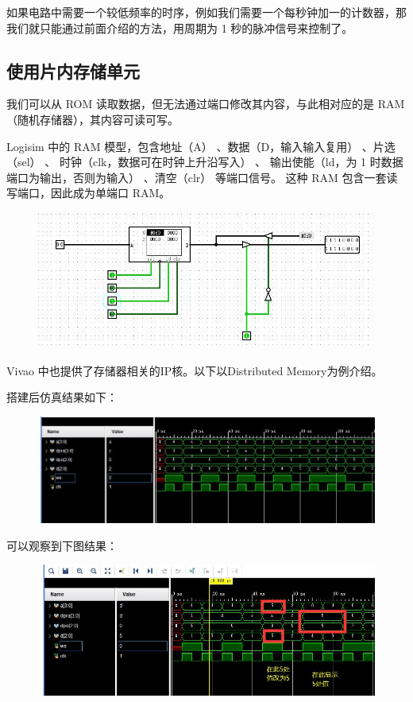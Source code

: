 \documentclass[UTF8]{article}
\begin{document}
	如果电路中需要一个较低频率的时序，例如我们需要一个每秒钟加一的计数器，那我们就只能通过前面介绍的方法，用周期为 1 秒的脉冲信号来控制了。\par
	
	\subsection{使用片内存储单元}
	我们可以从 ROM 读取数据，但无法通过端口修改其内容，与此相对应的是 RAM（随机存储器），其内容可读可写。\par
	Logisim 中的 RAM 模型，包含地址（A） 、数据（D，输入输入复用） 、片选（sel） 、	时钟（clk，数据可在时钟上升沿写入） 、 输出使能（ld，为 1 时数据端口为输出，否则为输入） 、清空（clr） 等端口信号。 这种 RAM 包含一套读写端口，因此成为单端口 RAM。 \par
	\begin{figure}[H]
		\centering
		\includegraphics[width=1\linewidth]{s5.jpg}
		\label{s5}
	\end{figure}\par
	Vivao 中也提供了存储器相关的IP核。以下以Distributed Memory为例介绍。\par
	搭建后仿真结果如下：\par
	\begin{figure}[H]
		\centering
		\includegraphics[width=1\linewidth]{s5_2.jpg}
		\label{s5_2}
	\end{figure}\par
	可以观察到下图结果：
	\begin{figure}[H]
		\centering
		\includegraphics[width=1\linewidth]{s5_3.jpg}
		\label{s5_3}
	\end{figure}\par
	
\end{document}
